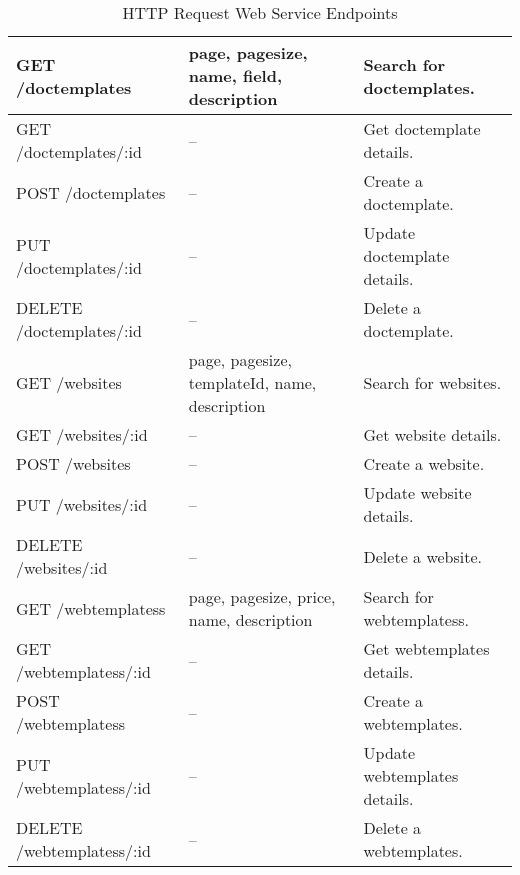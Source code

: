 \documentclass{article}
\begin{document}
\begin{table}
\begin{tabular}{|l|p{4.5cm}|l|}
         GET /doctemplates & page, pagesize, name, field, description & Search for doctemplates. \\\hline
         GET /doctemplates/:id & -- & Get doctemplate details. \\\hline
         POST /doctemplates & -- & Create a doctemplate. \\\hline
         PUT /doctemplates/:id & -- & Update doctemplate details. \\\hline
         DELETE /doctemplates/:id & -- & Delete a doctemplate. \\\hline
         GET /websites & page, pagesize, templateId, name, description & Search for websites. \\\hline
         GET /websites/:id & -- & Get website details. \\\hline
         POST /websites & -- & Create a website. \\\hline
         PUT /websites/:id & -- & Update website details. \\\hline
         DELETE /websites/:id & -- & Delete a website. \\\hline
         GET /webtemplatess & page, pagesize, price, name, description & Search for webtemplatess. \\\hline
         GET /webtemplatess/:id & -- & Get webtemplates details. \\\hline
         POST /webtemplatess & -- & Create a webtemplates. \\\hline
         PUT /webtemplatess/:id & -- & Update webtemplates details. \\\hline
         DELETE /webtemplatess/:id & -- & Delete a webtemplates. \\\hline
    \end{tabular}
    \caption{HTTP Request Web Service Endpoints}
    \label{endpoints}
\end{table}
\end{document}

